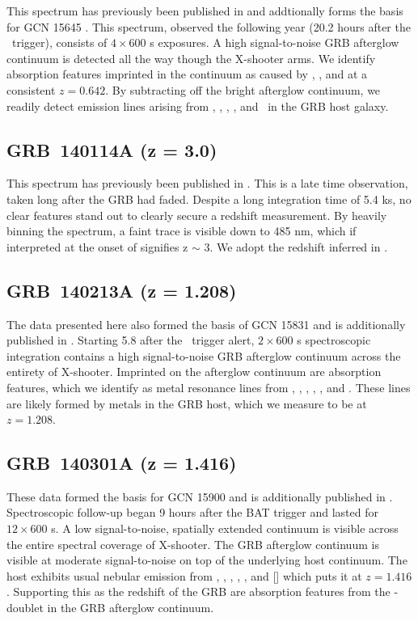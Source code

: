 \documentclass{aa}    %
\begin{document}
This spectrum has previously been published in \citet{Kruhler2015} and
addtionally forms the basis for GCN 15645 \citep{GCN15645}. This spectrum,
observed the following year (20.2 hours after the \swift~trigger), consists of
$4\times600$ s exposures. A high signal-to-noise GRB afterglow continuum is
detected all the way though the X-shooter arms. We identify absorption features
imprinted in the continuum as caused by \feii, \mgii, and \cahk at a consistent
$z = 0.642$. By subtracting off the bright afterglow continuum, we readily
detect emission lines arising from \oii, \hg, \hb, \oiii, and \ha~in the GRB
host galaxy.

\subsection{GRB~140114A (z = 3.0)}	\label{140114}

This spectrum has previously been published in \citet{Kruhler2015}. This is a
late time observation, taken long after the GRB had faded. Despite a long
integration time of 5.4 ks, no clear features stand out to clearly secure a
redshift measurement. By heavily binning the spectrum, a faint trace is visible
down to 485 nm, which if interpreted at the onset of \lya signifies z $\sim$
3. We adopt the redshift inferred in \citet{Kruhler2015}.

\subsection{GRB~140213A (z = 1.208)}\label{140213}

The data presented here also formed the basis of GCN 15831 \citep{GCN15831} and
is additionally published in \citet{Kruhler2015}. Starting 5.8 after the
\swift~trigger alert, $2\times600$ s spectroscopic integration contains a high
signal-to-noise GRB afterglow continuum across the entirety of X-shooter.
Imprinted on the afterglow continuum are absorption features, which we identify
as metal resonance lines from \civ, \alii, \aliii, \feii, \mgii, and \mgi. These
lines are likely formed by metals in the GRB host, which we measure to be at $z
= 1.208$.

\subsection{GRB~140301A (z = 1.416)}\label{140301}

These data formed the basis for GCN 15900 \citep{GCN15900} and is additionally
published in \citet{Kruhler2015}. Spectroscopic follow-up began 9 hours after
the BAT trigger and lasted for $12\times600$ s. A low signal-to-noise, spatially
extended continuum is visible across the entire spectral coverage of X-shooter.
The GRB afterglow continuum is visible at moderate signal-to-noise on top of the
underlying host continuum. The host exhibits usual nebular emission from \oii,
\hb, \oiii, \ha, \nii, and [\sii] which puts it at $z = 1.416$. Supporting this as
the redshift of the GRB are absorption features from the \mgii-doublet in the
GRB afterglow continuum.
\end{document}
